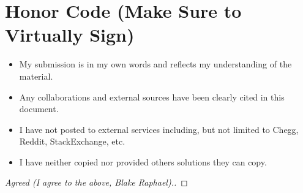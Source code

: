 \documentclass[11pt]{article}
\theoremstyle{definition}
\theoremstyle{definition}
\theoremstyle{definition}
\begin{document}
\section{Honor Code (Make Sure to Virtually Sign)} \label{HonorCode}

\begin{itemize}
\item My submission is in my own words and reflects my understanding of the material.
\item Any collaborations and external sources have been clearly cited in this document.
\item I have not posted to external services including, but not limited to Chegg, Reddit, StackExchange, etc.
\item I have neither copied nor provided others solutions they can copy.
\end{itemize}


\begin{proof}[Agreed (I agree to the above, Blake Raphael).]
\end{proof}
\newpage
\end{document}
